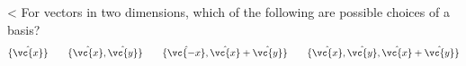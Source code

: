 <%
For vectors in two dimensions, which of the following are possible
choices of a basis?
\begin{equation*}
  \{\hat{\vc{x}}\} \qquad
  \{\hat{\vc{x}},\hat{\vc{y}}\} \qquad
  \{\hat{\vc{-x}},\hat{\vc{x}}+\hat{\vc{y}}\} \qquad
  \{\hat{\vc{x}},\hat{\vc{y}},\hat{\vc{x}}+\hat{\vc{y}}\} 
\end{equation*}
